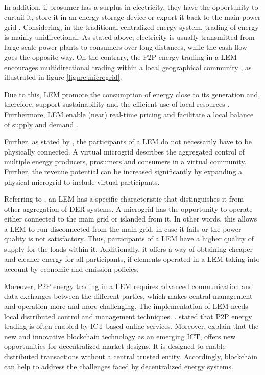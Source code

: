In addition, if prosumer has a surplus in electricity, they have the opportunity 
to curtail it, store it in an energy storage device or export it back to the main power grid .
Considering, in the traditional centralized energy system, trading of energy is mainly unidirectional.
As stated above, electricity is usually transmitted from large-scale power plants to 
consumers over long distances, while the cash-flow goes the opposite way. 
On the contrary, the P2P energy trading in a LEM encourages multidirectional trading within 
a local geographical community , as illustrated in figure \ref{figure:microgrid}.

Due to this, LEM promote the consumption of energy close to its generation and, therefore, 
support sustainability and the efficient use of local resources .
Furthermore, LEM enable (near) real-time pricing and facilitate a local balance
of supply and demand . 

Further, as stated by ,
the participants of a LEM do not necessarily have to be physically connected. A virtual microgrid
describes the aggregated control of multiple energy producers, prosumers and consumers in a virtual 
community. Further, the revenue potential can be increased significantly by expanding a physical 
microgrid to include virtual participants. 

Referring to , an LEM has a specific characteristic
that distinguishes it from other aggregation of DER systems. A microgrid has the opportunity
to operate either connected to the main grid or islanded from it. In other words,
this allows a LEM to run disconnected from the main grid, in case it fails or 
the power quality is not satisfactory. Thus, participants of a LEM have a higher quality 
of supply for the loads within it. Additionally, it offers a way of obtaining cheaper 
and cleaner energy for all participants, if elements operated in a LEM taking into 
account by economic and emission policies.

Moreover, P2P energy trading in a LEM requires advanced communication and data 
exchanges between the different parties, which makes central management and 
operation more and more challenging. The implementation of LEM needs 
local distributed control and management techniques. . 
 stated that P2P energy trading is often
enabled by ICT-based online services. Moreover,  explain that 
the new and innovative blockchain technology as an emerging ICT, 
offers new opportunities for decentralized market designs.
It is designed to enable distributed transactions without 
a central trusted entity.
Accordingly, blockchain can help to address the challenges faced by 
decentralized energy systems. 


